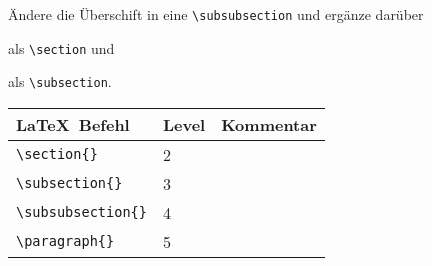 \begin{frame}[fragile]
	\Aufgabee
	Ändere die Überschift  in eine \lstinline[basicstyle=\normalfont\ttfamily\normalsize]|\subsubsection| 
	und ergänze darüber
		
		\textrm{}
		
	als \lstinline[basicstyle=\normalfont\ttfamily\normalsize]|\section| und 
		
		\textrm{}
		
	als  \lstinline[basicstyle=\normalfont\ttfamily\normalsize]|\subsection|.
	\btVFill\Befehle
	\begin{center}
		\begin{tabular}{lll}
			\toprule
			\LaTeX\ Befehl					&	Level	&	Kommentar	\\ \midrule
			\lstinline|\section{}|			&	2		&	\\
			\lstinline|\subsection{}|		&	3		&	\\
			\lstinline|\subsubsection{}|	&	4		&	\\
			\lstinline|\paragraph{}|		&	5		&	\\
			\bottomrule
		\end{tabular}
	\end{center}
	\vspace{0.5cm}
	\vspace{0.1cm}
\end{frame}
